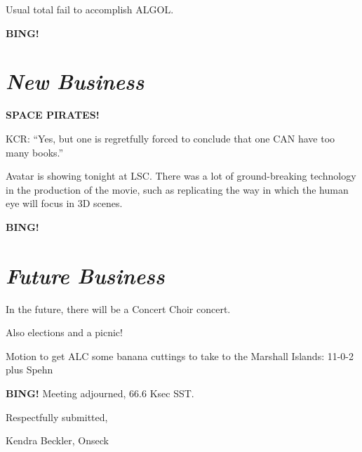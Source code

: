 \documentclass[10pt]{article}
\newcommand{\bing}{{\bf BING!} }
\newcommand{\goto}[1]{\bing \vskip 12pt \section*{{\em{#1}}}}
\newcommand{\ps}{ plus Spehn\xspace}
\newcommand{\onseck}{Kendra Beckler, Onseck}
\begin{document}
Usual total fail to accomplish ALGOL.

\goto{New Business}

\textbf{SPACE PIRATES!}

KCR: ``Yes, but one is regretfully forced to conclude that one CAN have too 
many books.''

Avatar is showing tonight at LSC.  There was a lot of ground-breaking technology
in the production of the movie, such as replicating the way in which the human
eye will focus in 3D scenes.

\goto{Future Business}

In the future, there will be a Concert Choir concert.

Also elections and a picnic!

Motion to get ALC some banana cuttings to take to the Marshall Islands: 11-0-2 
\ps

\bing
\noindent
Meeting adjourned, 66.6 Ksec SST.

\vspace{18pt}

\centerline{Respectfully submitted,}
\centerline{\onseck}
\end{document}
